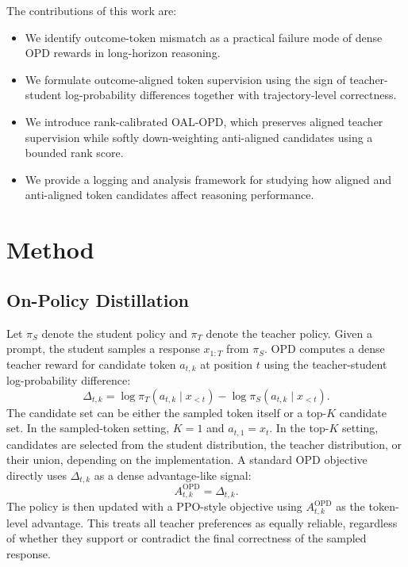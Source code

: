 \documentclass[letterpaper]{article} %
\begin{document}
The contributions of this work are:
\begin{itemize}
    \item We identify outcome-token mismatch as a practical failure mode of dense OPD rewards in long-horizon reasoning.
    \item We formulate outcome-aligned token supervision using the sign of teacher-student log-probability differences together with trajectory-level correctness.
    \item We introduce rank-calibrated OAL-OPD, which preserves aligned teacher supervision while softly down-weighting anti-aligned candidates using a bounded rank score.
    \item We provide a logging and analysis framework for studying how aligned and anti-aligned token candidates affect reasoning performance.
\end{itemize}

\section{Method}

\subsection{On-Policy Distillation}

Let $\pi_S$ denote the student policy and $\pi_T$ denote the teacher policy. Given a prompt, the student samples a response $x_{1:T}$ from $\pi_S$. OPD computes a dense teacher reward for candidate token $a_{t,k}$ at position $t$ using the teacher-student log-probability difference:
\begin{equation}
\Delta_{t,k}
=
\log \pi_T(a_{t,k} \mid x_{<t})
-
\log \pi_S(a_{t,k} \mid x_{<t}).
\end{equation}
The candidate set can be either the sampled token itself or a top-$K$ candidate set. In the sampled-token setting, $K=1$ and $a_{t,1}=x_t$. In the top-$K$ setting, candidates are selected from the student distribution, the teacher distribution, or their union, depending on the implementation. A standard OPD objective directly uses $\Delta_{t,k}$ as a dense advantage-like signal:
\begin{equation}
A^{\mathrm{OPD}}_{t,k} = \Delta_{t,k}.
\end{equation}
The policy is then updated with a PPO-style objective using $A^{\mathrm{OPD}}_{t,k}$ as the token-level advantage. This treats all teacher preferences as equally reliable, regardless of whether they support or contradict the final correctness of the sampled response.
\end{document}
